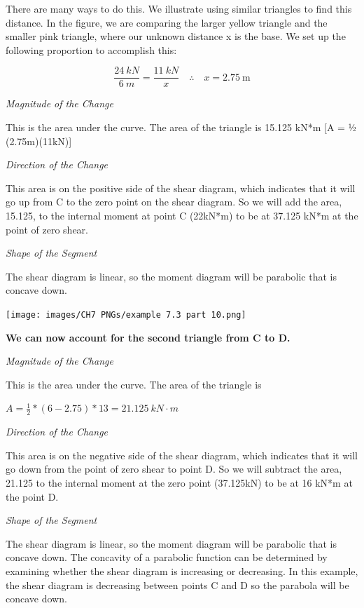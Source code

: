 \documentclass[
  letterpaper,
  DIV=11,
  numbers=noendperiod]{scrreprt}
\begin{document}
\begin{tcolorbox}
\begin{tcolorbox}
There are many ways to do this. We illustrate using similar triangles to
find this distance. In the figure, we are comparing the larger yellow
triangle and the smaller pink triangle, where our unknown distance x is
the base. We set up the following proportion to accomplish this:

\[
\frac{24{~kN}}{6{~m}}=\frac{11{~kN}}{x} \quad \therefore \quad x=2.75 \mathrm{~m}
\]

\emph{Magnitude of the Change}

This is the area under the curve. The area of the triangle is 15.125
kN*m {[}A = ½ (2.75m)(11kN){]}

\emph{Direction of the Change}

This area is on the positive side of the shear diagram, which indicates
that it will go up from C to the zero point on the shear diagram. So we
will add the area, 15.125, to the internal moment at point C (22kN*m) to
be at 37.125 kN*m at the point of zero shear.

\emph{Shape of the Segment}

The shear diagram is linear, so the moment diagram will be parabolic
that is concave down.

\begin{center}
\texttt{[image: images/CH7 PNGs/example 7.3 part 10.png]}
\end{center}

\textbf{We can now account for the second triangle from C to D.}

\emph{Magnitude of the Change}

This is the area under the curve. The area of the triangle is

\(A=\frac{1}{2}*(6-2.75)*13=21.125{~kN\cdot m}\)

\emph{Direction of the Change}

This area is on the negative side of the shear diagram, which indicates
that it will go down from the point of zero shear to point D. So we will
subtract the area, 21.125 to the internal moment at the zero point
(37.125kN) to be at 16 kN*m at the point D.

\emph{Shape of the Segment}

The shear diagram is linear, so the moment diagram will be parabolic
that is concave down. The concavity of a parabolic function can be
determined by examining whether the shear diagram is increasing or
decreasing. In this example, the shear diagram is decreasing between
points C and D so the parabola will be concave down.


\end{tcolorbox}
\end{tcolorbox}
\end{document}
